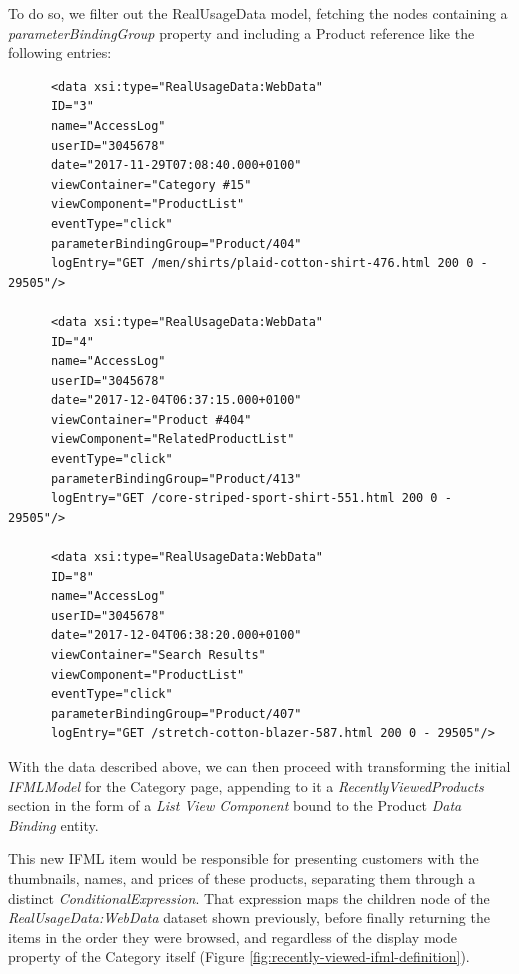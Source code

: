To do so, we filter out the RealUsageData model, fetching the nodes containing a \textit{parameterBindingGroup} property and including a Product reference like the following entries:

\vspace{0.5cm}
\lstset{language=XML}
\begin{lstlisting} 
      <data xsi:type="RealUsageData:WebData"
      ID="3"
      name="AccessLog"
      userID="3045678"
      date="2017-11-29T07:08:40.000+0100"
      viewContainer="Category #15"
      viewComponent="ProductList"
      eventType="click"
      parameterBindingGroup="Product/404"
      logEntry="GET /men/shirts/plaid-cotton-shirt-476.html 200 0 - 29505"/>
      
      <data xsi:type="RealUsageData:WebData"
      ID="4"
      name="AccessLog"
      userID="3045678"
      date="2017-12-04T06:37:15.000+0100"
      viewContainer="Product #404"
      viewComponent="RelatedProductList"
      eventType="click"
      parameterBindingGroup="Product/413"
      logEntry="GET /core-striped-sport-shirt-551.html 200 0 - 29505"/>

      <data xsi:type="RealUsageData:WebData"
      ID="8"
      name="AccessLog"
      userID="3045678"
      date="2017-12-04T06:38:20.000+0100"
      viewContainer="Search Results"
      viewComponent="ProductList"
      eventType="click"
      parameterBindingGroup="Product/407"
      logEntry="GET /stretch-cotton-blazer-587.html 200 0 - 29505"/>
\end{lstlisting}
\vspace{0.5cm}

With the data described above, we can then proceed with transforming the initial \textit{IFMLModel} for the Category page, appending to it a \textit{RecentlyViewedProducts} section in the form of a \textit{List View Component} bound to the Product \textit{Data Binding} entity.

This new IFML item would be responsible for presenting customers with the thumbnails, names, and prices of these products, separating them through a distinct \textit{ConditionalExpression}. That expression maps the children node of the \textit{RealUsageData:WebData} dataset shown previously, before finally returning the items in the order they were browsed, and regardless of the display mode property of the Category itself (Figure \ref{fig:recently-viewed-ifml-definition}).

